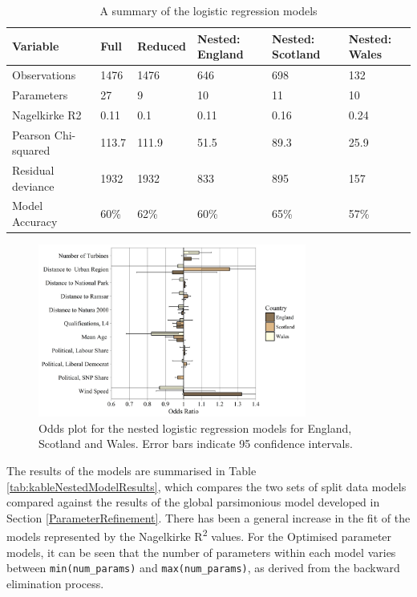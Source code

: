 \documentclass[a4paper,]{article}
\theoremstyle{definition}
\theoremstyle{definition}
\theoremstyle{definition}
\theoremstyle{remark}
\begin{document}
\begin{table}

\caption{\label{tab:ModelsSummary}A summary of the logistic regression models}
\centering
\begin{tabular}[t]{llllll}
\toprule
Variable & Full & Reduced & Nested:
England & Nested:
Scotland & Nested:
Wales\\
\midrule
Observations & 1476 & 1476 & 646 & 698 & 132\\
Parameters & 27 & 9 & 10 & 11 & 10\\
Nagelkirke R2 & 0.11 & 0.1 & 0.11 & 0.16 & 0.24\\
Pearson Chi-squared & 113.7 & 111.9 & 51.5 & 89.3 & 25.9\\
Residual deviance & 1932 & 1932 & 833 & 895 & 157\\
Model Accuracy & 60\% & 62\% & 60\% & 65\% & 57\%\\
\bottomrule
\end{tabular}
\end{table}

\begin{figure}[h]

{\centering \includegraphics[width=8.8cm]{figures/OddsPlotSegmented} 

}

\caption{Odds plot for the nested logistic regression models for England, Scotland and Wales. Error bars indicate 95 confidence intervals.}\label{fig:OddsPlotSegmented}
\end{figure}

The results of the models are summarised in Table
\ref{tab:kableNestedModelResults}, which compares the two sets of split
data models compared against the results of the global parsimonious
model developed in Section \ref{ParameterRefinement}. There has been a
general increase in the fit of the models represented by the Nagelkirke
R\textsuperscript{2} values. For the Optimised parameter models, it can
be seen that the number of parameters within each model varies between
\texttt{min(num\_params)} and \texttt{max(num\_params)}, as derived from
the backward elimination process.
\end{document}
